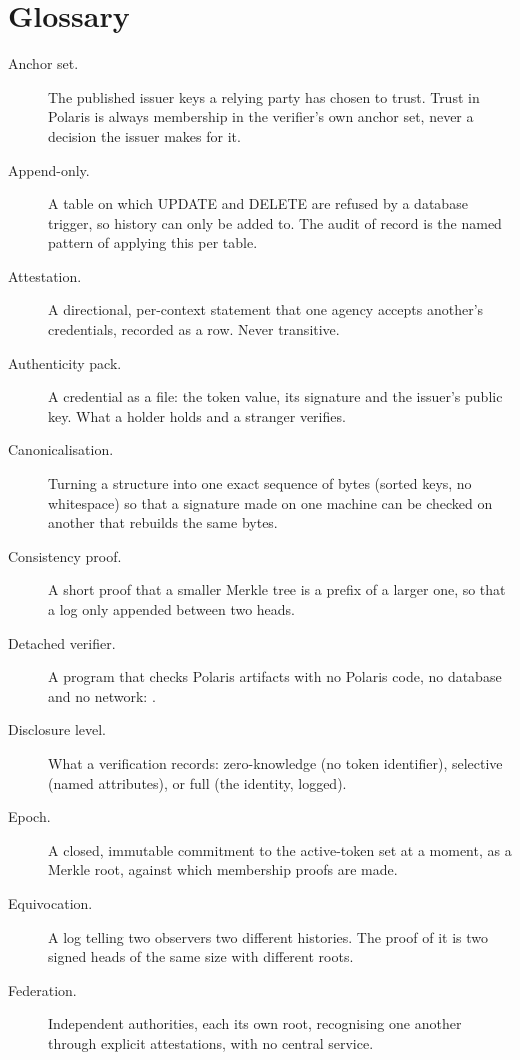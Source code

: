 \section{Glossary}
\label{app:glossary}

\begin{description}
  \item[Anchor set.] The published issuer keys a relying party has chosen to trust. Trust in Polaris
    is always membership in the verifier's own anchor set, never a decision the issuer makes for it.
  \item[Append-only.] A table on which UPDATE and DELETE are refused by a database trigger, so history
    can only be added to. The audit of record is the named pattern of applying this per table.
  \item[Attestation.] A directional, per-context statement that one agency accepts another's
    credentials, recorded as a row. Never transitive.
  \item[Authenticity pack.] A credential as a file: the token value, its signature and the issuer's
    public key. What a holder holds and a stranger verifies.
  \item[Canonicalisation.] Turning a structure into one exact sequence of bytes (sorted keys, no
    whitespace) so that a signature made on one machine can be checked on another that rebuilds the
    same bytes.
  \item[Consistency proof.] A short proof that a smaller Merkle tree is a prefix of a larger one, so
    that a log only appended between two heads.
  \item[Detached verifier.] A program that checks Polaris artifacts with no Polaris code, no database
    and no network: .
  \item[Disclosure level.] What a verification records: zero-knowledge (no token identifier),
    selective (named attributes), or full (the identity, logged).
  \item[Epoch.] A closed, immutable commitment to the active-token set at a moment, as a Merkle root,
    against which membership proofs are made.
  \item[Equivocation.] A log telling two observers two different histories. The proof of it is two
    signed heads of the same size with different roots.
  \item[Federation.] Independent authorities, each its own root, recognising one another through
    explicit attestations, with no central service.

\end{description}
